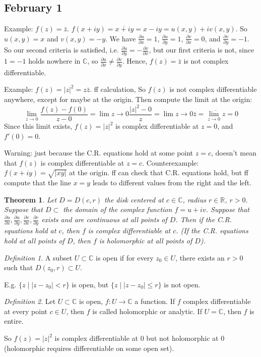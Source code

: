 \documentclass{article}
\theoremstyle{plain}
\newtheorem{theorem}{Theorem}
\theoremstyle{remark}
\newtheorem{definition}{Definition}
\newcommand{\R}{{\mathbb R}}
\newcommand{\C}{{\mathbb C}}
\begin{document}
\subsection{February 1}
Example: $f(z) = \bar{z}$.
$f(x+iy) = \overline{x+iy} = x -iy = u(x,y) + iv(x,y)$.
So $u(x,y) = x$ and $v(x,y) = -y$.
We have $\frac{\partial u}{\partial x} = 1$,
$\frac{\partial u}{\partial y} = 1$, $\frac{\partial v}{\partial x} = 0$,
and $\frac{\partial v}{\partial y} = -1$.
So our second criteria is satisfied, i.e.
$\frac{\partial u}{\partial y} = -\frac{\partial v}{\partial x}$,
but our first criteria is not, since $1 = -1$ holds nowhere in $\C$,
so $\frac{\partial u}{\partial x} \neq \frac{\partial v}{\partial y}$.
Hence, $f(z) = \bar{z}$ is not complex differentiable.

Example: $f(z) = |z|^2 = z\bar{z}$.
ff calculation,
So $f(z)$ is not complex differentiable anywhere,
except for maybe at the origin.
Then compute the limit at the origin:
\[
	\lim_{z \to 0} \frac{f(z) - f(0)}{z - 0}
	= \lim{z \to 0}\frac{|z|^2 - 0}{z}
	= \lim{z \to 0}\bar{z} = \overline{\lim_{z \to 0}z} = 0
\]
Since this limit exists, $f(z) = |z|^2$ is complex differentiable at $z = 0$,
and $f'(0) = 0$.

Warning: just because the C.R. equations hold at some point $z = c$,
doesn't mean that $f(z)$ is complex differentiable at $z = c$.
Counterexample: $f(x + iy) = \sqrt{|xy|}$ at the origin.
ff can check that C.R. equations hold,
but ff compute that the line $x = y$ leads to different values
from the right and the left.

\begin{theorem}
	Let $D = D(c,r)$ the disk centered at $c \in \C$, radius $r \in \R$, $r > 0$.
	Suppose that $D \subset$ the domain of the complex function $f = u + iv$.
	Suppose that $\frac{\partial u}{\partial x},\frac{\partial u}{\partial y},
	\frac{\partial v}{\partial x},\frac{\partial v}{\partial y}$
	exists and are continuous at all points of $D$.
	Then if the C.R. equations hold at $c$, then $f$ is complex differentiable at $c$.
	(If the C.R. equations hold at all points of $D$,
	then $f$ is holomorphic at all points of $D$).
\end{theorem}

\begin{definition}
	A subset $U \subset \C$ is open if
	for every $z_0 \in U$, there exists an $r > 0$ such that $D(z_0,r) \subset U$.
\end{definition}
E.g. $\{z \mid |z - z_0| < r\}$ is open, but
$\{z \mid |z - z_0| \leq r\}$ is not open.

\begin{definition}
	Let $U \subset \C$ is open, $f \colon U \to \C$ a function.
	If $f$ complex differentiable at every point $c \in U$, then $f$ is called
	holomorphic or analytic.
	If $U = \C$, then $f$ is entire.
\end{definition}
So $f(z) = |z|^2$ is complex differentiable at $0$ but not holomorphic at $0$
(holomorphic requires differentiable on some open set).
\end{document}
